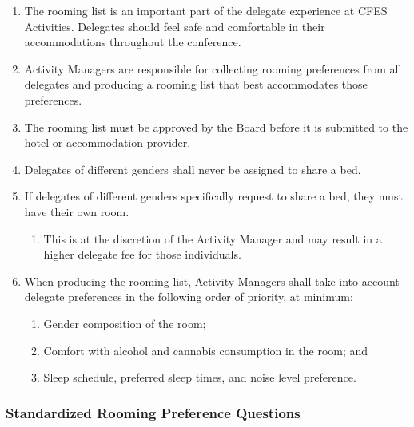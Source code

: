 \begin{enumerate}
 \item
  The rooming list is an important part of the delegate experience at CFES Activities. Delegates should feel safe and comfortable in their accommodations throughout the conference.
 \item
  Activity Managers are responsible for collecting rooming preferences from all delegates and producing a rooming list that best accommodates those preferences.
 \item
  The rooming list must be approved by the Board before it is submitted to the hotel or accommodation provider.
 \item
  Delegates of different genders shall never be assigned to share a bed.
 \item
  If delegates of different genders specifically request to share a bed, they must have their own room.

  \begin{enumerate}
   \item
    This is at the discretion of the Activity Manager and may result in a higher delegate fee for those individuals.
  \end{enumerate}
 \item
  When producing the rooming list, Activity Managers shall take into account delegate preferences in the following order of priority, at minimum:
  \begin{enumerate}
   \item
    Gender composition of the room;
   \item
    Comfort with alcohol and cannabis consumption in the room; and
   \item
    Sleep schedule, preferred sleep times, and noise level preference.
  \end{enumerate}
\end{enumerate}

\subsubsection{Standardized Rooming Preference Questions}
\label{standardized-rooming-questions}

